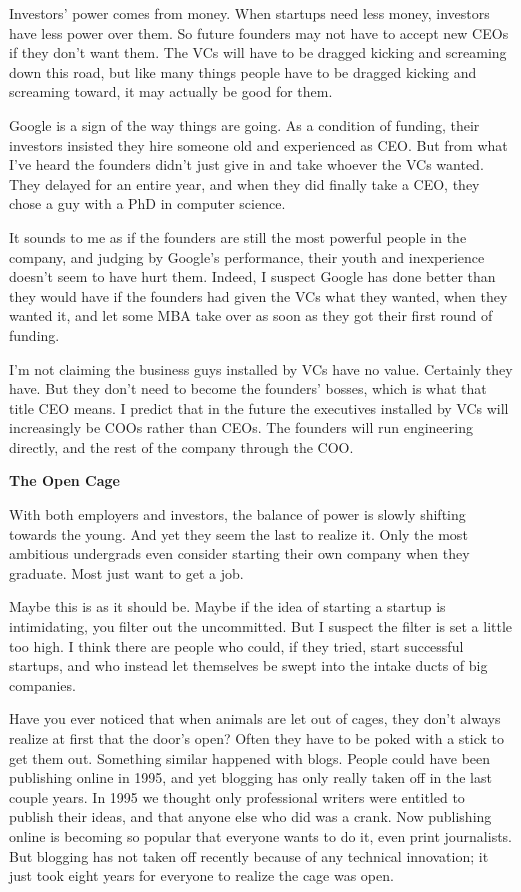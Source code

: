 Investors' power comes from money. When startups need less money,
investors have less power over them. So future founders may not have to
accept new CEOs if they don't want them. The VCs will have to be dragged
kicking and screaming down this road, but like many things people have
to be dragged kicking and screaming toward, it may actually be good for
them.

Google is a sign of the way things are going. As a condition of funding,
their investors insisted they hire someone old and experienced as CEO.
But from what I've heard the founders didn't just give in and take
whoever the VCs wanted. They delayed for an entire year, and when they
did finally take a CEO, they chose a guy with a PhD in computer science.

It sounds to me as if the founders are still the most powerful people in
the company, and judging by Google's performance, their youth and
inexperience doesn't seem to have hurt them. Indeed, I suspect Google
has done better than they would have if the founders had given the VCs
what they wanted, when they wanted it, and let some MBA take over as
soon as they got their first round of funding.

I'm not claiming the business guys installed by VCs have no value.
Certainly they have. But they don't need to become the founders' bosses,
which is what that title CEO means. I predict that in the future the
executives installed by VCs will increasingly be COOs rather than CEOs.
The founders will run engineering directly, and the rest of the company
through the COO.

\textbf{The Open Cage}

With both employers and investors, the balance of power is slowly
shifting towards the young. And yet they seem the last to realize it.
Only the most ambitious undergrads even consider starting their own
company when they graduate. Most just want to get a job.

Maybe this is as it should be. Maybe if the idea of starting a startup
is intimidating, you filter out the uncommitted. But I suspect the
filter is set a little too high. I think there are people who could, if
they tried, start successful startups, and who instead let themselves be
swept into the intake ducts of big companies.

Have you ever noticed that when animals are let out of cages, they don't
always realize at first that the door's open? Often they have to be
poked with a stick to get them out. Something similar happened with
blogs. People could have been publishing online in 1995, and yet
blogging has only really taken off in the last couple years. In 1995 we
thought only professional writers were entitled to publish their ideas,
and that anyone else who did was a crank. Now publishing online is
becoming so popular that everyone wants to do it, even print
journalists. But blogging has not taken off recently because of any
technical innovation; it just took eight years for everyone to realize
the cage was open.

